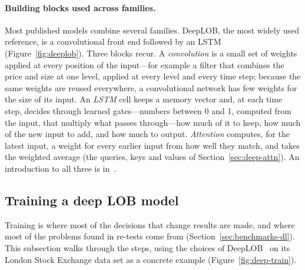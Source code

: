 \paragraph{Building blocks used across families.} Most published models combine several families. DeepLOB, the most
widely used reference, is a convolutional front end followed by an LSTM (Figure~\ref{fig:deeplob}). Three blocks
recur. A \emph{convolution} is a small set of weights applied at every position of the input---for example a
filter that combines the price and size at one level, applied at every level and every time step; because the
same weights are reused everywhere, a convolutional network has few weights for the size of its input. An
\emph{LSTM} cell keeps a memory vector and, at each time step, decides through learned gates---numbers between 0 and 1, computed from the input, that multiply what passes through---how much of it to keep,
how much of the new input to add, and how much to output. \emph{Attention} computes, for the latest input, a weight
for every earlier input from how well they match, and takes the weighted average (the queries, keys and values of
Section~\ref{sec:deep-attn}). An introduction to all three is in~\citet{goodfellow2016}.

\subsection{Training a deep LOB model}
\label{sec:deep-train}

Training is where most of the decisions that change results are made, and where most of the problems found in
re-tests come from (Section~\ref{sec:benchmarks-dl}). This subsection walks through the steps, using the choices of
DeepLOB~\citep{zhang2019} on its London Stock Exchange data set as a concrete example (Figure~\ref{fig:deep-train}).

